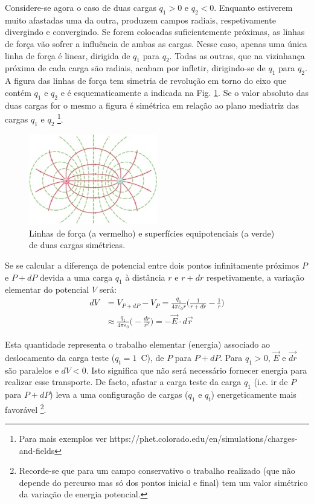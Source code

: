 \documentclass[12pt,a4paper,oneside]{paper}
\begin{document}
Considere-se agora o caso de duas cargas $q_1 > 0$ e $q_2 < 0$. Enquanto estiverem muito afastadas uma da outra, produzem
campos radiais, respetivamente divergindo e convergindo. Se forem colocadas suficientemente próximas, as linhas de força
vão sofrer a influência de ambas as cargas. Nesse caso, apenas uma única linha de força é linear, dirigida de $q_1$ para $q_2$.
Todas as outras, que na vizinhança próxima de cada carga são radiais, acabam por infletir, dirigindo-se de $q_1$ para $q_2$.
A figura das linhas de força tem simetria de revolução em torno do eixo que contém $q_1$ e $q_2$ e é esquematicamente a
indicada na Fig. \ref{fig:sup-equip}. Se o valor absoluto das duas cargas for o mesmo a figura é simétrica em relação ao
plano mediatriz das cargas $q_1$ e $q_2$ \footnote{Para mais exemplos ver https://phet.colorado.edu/en/simulations/charges-and-fields}.

\begin{figure}[H]
  \centering 
	\includegraphics[width=0.5\textwidth]{./thomson_images/fig2-thomson} 
	\caption{ Linhas de força (a vermelho) e superfícies equipotenciais (a verde) de duas cargas simétricas. \label{fig:sup-equip}} 
\end{figure}

Se se calcular a diferença de potencial entre dois pontos infinitamente próximos $P$ e $P+dP$ devida a uma carga $q_1$ à
distância $r$ e $r+dr$ respetivamente, a variação elementar do potencial $V$ será:
\begin{align}
d V &= V_{P+dP} - V_P = \frac{q_1}{4 \pi \varepsilon_0 r} \big(  \frac{1}{r + dr} -\frac{1}{r} \big)\nonumber\\
	 &\approx \frac{q_1}{4 \pi \varepsilon_0 } \big(  - \frac{dr}{r^2} \big) = - \vec{E} \cdot d \vec{r}  \end{align}

Esta quantidade representa o trabalho elementar (energia) associado ao deslocamento da
carga teste ($q_t=1\,$ C), de $P$ para $P+dP$. Para $q_1 > 0$,	$\vec{E}$ e $\vec{dr}$ são paralelos e $dV < 0$. Isto
significa que
não será necessário fornecer energia para realizar esse transporte. 
De facto, afastar a carga teste da carga $q_1$ (i.e. ir de $P$ para $P+dP$) leva a uma configuração de cargas ($q_1$ e $q_t$)
energeticamente mais favorável \footnote{Recorde-se que para um campo conservativo o trabalho realizado (que não depende do
percurso mas só dos pontos inicial e final) tem um valor simétrico da variação de energia potencial.}.
\end{document}
